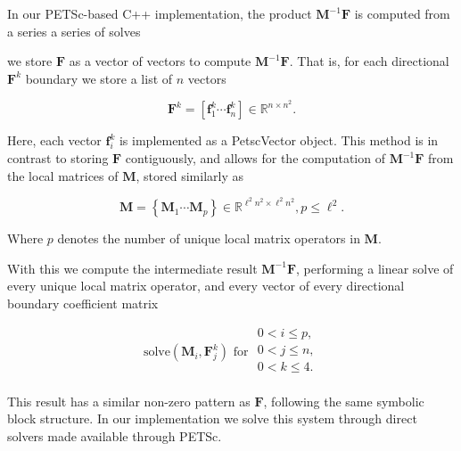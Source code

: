 \noindent
In our PETSc-based C++ implementation, the product 
$\textbf{M}^{-1}\textbf{F}$ is computed from a series a series of solves 

we store $\textbf{F}$ as a vector 
of vectors to compute $\textbf{M}^{-1}\textbf{F}$. That is, for each 
directional $\textbf{F}^k$ boundary we store a list of $n$ vectors

\begin{equation}
	\textbf{F}^k = \left[\textbf{f}^k_1 \cdots \textbf{f}^k_n\right] 
	\in \mathbb{R}^{n \times n^2}.
\end{equation} 

\noindent
Here, each vector $\textbf{f}^k_i$ is implemented as a PetscVector object.
This method is in contrast to storing $\textbf{F}$ contiguously, and 
allows for the computation of $\textbf{M}^{-1}\textbf{F}$ from the local 
matrices of $\textbf{M}$, stored similarly as

\begin{equation}
	\textbf{M} = \left\{\textbf{M}_1 \cdots \textbf{M}_p\right\} \in 
	\mathbb{R}^{\ell^2 n^2 \times \ell^2 n^2}, p \leq \ell^2.
\end{equation} 

\noindent 
Where $p$ denotes the number of unique local matrix operators in 
$\textbf{M}$. 

With this we compute the intermediate result $\textbf{M}^{-1}\textbf{F}$, 
performing a linear solve of every unique local matrix operator, and 
every vector of every directional boundary coefficient matrix 

\begin{equation}
	\text{solve}(\textbf{M}_{i}, \textbf{F}^{k}_j) \text{  for }
	\begin{array}{l}
		0 < i \leq p, \\
		0 < j \leq n, \\
		0 < k \leq 4. \\ 
	\end{array}
	\label{eqn:mfsolves}
\end{equation}

\noindent
This result has a similar non-zero pattern as $\textbf{F}$, following the same symbolic block structure. In our implementation we solve this system through direct solvers made available through PETSc. 

